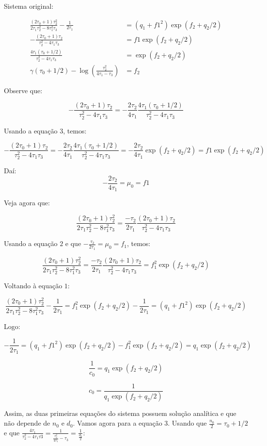 \documentclass[
]{article}
\begin{document}
Sistema original:

\[
\begin{align}
\frac{(2\tau_0+1)\tau_2^2}{2\tau_1\tau_2^2-8\tau_1^2\tau_3}-\frac{1}{2\tau_1} & = (q_1+f1^2)\exp(f_2+q_2/2)\\
-\frac{(2\tau_0+1)\tau_2}{\tau_2^2-4\tau_1\tau_3} & = f1\exp(f_2+q_2/2)\\
\frac{4\tau_1(\tau_0+1/2)}{\tau_2^2-4\tau_1\tau_3} & = \exp(f_2+q_2/2)\\
\gamma(\tau_0+1/2)-\log(\frac{\tau_2^2}{4\tau_1-\tau_3}) & = f_2
\end{align}
\]

Observe que:

\[
-\frac{(2\tau_0+1)\tau_2}{\tau_2^2-4\tau_1\tau_3}=-\frac{2\tau_2}{4\tau_1}\frac{4\tau_1(\tau_0+1/2)}{\tau_2^2-4\tau_1\tau_3}
\]

Usando a equação \(3\), temos:

\[
-\frac{(2\tau_0+1)\tau_2}{\tau_2^2-4\tau_1\tau_3}=-\frac{2\tau_2}{4\tau_1}\frac{4\tau_1(\tau_0+1/2)}{\tau_2^2-4\tau_1\tau_3}=-\frac{2\tau_2}{4\tau_1}\exp(f_2+q_2/2)=f1 \exp(f_2+q_2/2)
\]

Daí: \[
-\frac{2\tau_2}{4\tau_1}=\mu_0=f1 
\]

Veja agora que:

\[
\frac{(2\tau_0+1)\tau_2^2}{2\tau_1\tau_2^2-8\tau_1^2\tau_3}=\frac{-\tau_2}{2\tau_1}\frac{(2\tau_0+1)\tau_2}{\tau_2^2-4\tau_1\tau_3}
\]

Usando a equação \(2\) e que \(-\frac{\tau_2}{2\tau_1}=\mu_0=f_1\),
temos:

\[
\frac{(2\tau_0+1)\tau_2^2}{2\tau_1\tau_2^2-8\tau_1^2\tau_3}=\frac{-\tau_2}{2\tau_1}\frac{(2\tau_0+1)\tau_2}{\tau_2^2-4\tau_1\tau_3}=f_1^2\exp(f_2+q_2/2)
\]

Voltando à equação \(1\):

\[
\frac{(2\tau_0+1)\tau_2^2}{2\tau_1\tau_2^2-8\tau_1^2\tau_3}-\frac{1}{2\tau_1} = f_1^2\exp(f_2+q_2/2) -\frac{1}{2\tau_1} = (q_1+f1^2)\exp(f_2+q_2/2)
\]

Logo:

\[
 -\frac{1}{2\tau_1} = (q_1+f1^2)\exp(f_2+q_2/2) - f_1^2\exp(f_2+q_2/2)=q_1\exp(f_2+q_2/2)
\]

\[
 \frac{1}{c_0} = q_1\exp(f_2+q_2/2)
\]

\[
c_0 = \frac{1}{q_1\exp(f_2+q_2/2)}
\]

Assim, as duas primeiras equações do sistema possuem solução analítica e
que não depende de \(n_0\) e \(d_0\). Vamos agora para a equação \(3\).
Usando que \(\frac{n_0}{2}=\tau_0+1/2\) e que
\(\frac{4\tau_1}{\tau_2^2-4\tau_1\tau3}=\frac{1}{\frac{\tau_2^2}{4\tau_1}-\tau_3}=\frac{1}{\frac{d_0}{2}}\):
\end{document}
